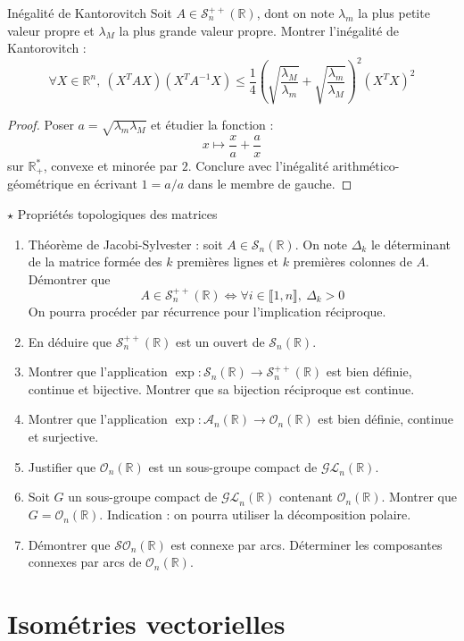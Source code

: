 \documentclass[french,a4paper]{article}
\newcommand{\R}{\mathbb{R}}
\newcommand{\st}{^*}
\newcommand{\inv}{^{-1}}
\theoremstyle{plain}
\theoremstyle{definition}
\theoremstyle{remark}
\begin{document}
\begin{ex}[cas]{Inégalité de Kantorovitch}
	Soit $A\in\mathcal{S}_n^{++}(\R)$, dont on note $\lambda_m$ la plus petite valeur propre et $\lambda_M$ la plus grande valeur propre. Montrer l'inégalité de Kantorovitch : $$\forall X\in\R^n,\ (X^TAX)(X^TA\inv X)\leqslant\frac{1}{4}\left(\sqrt{\frac{\lambda_M}{\lambda_m}}+\sqrt{\frac{\lambda_m}{\lambda_M}}\right)^2(X^TX)^2$$
\end{ex}
\begin{proof}
	Poser $a=\sqrt{\lambda_m\lambda_M}$ et étudier la fonction : $$x\mapsto\frac{x}{a}+\frac{a}{x}$$ sur $\R_+\st$, convexe et minorée par $2$. Conclure avec l'inégalité arithmético-géométrique en écrivant $1=a/a$ dans le membre de gauche.
\end{proof}

\begin{ex}[Châteaux]{$\star$ Propriétés topologiques des matrices}
	\begin{enumerate}
		\item Théorème de Jacobi-Sylvester : soit $A\in\mathcal{S}_n(\R)$. On note $\Delta_k$ le déterminant de la matrice formée des $k$ premières lignes et $k$ premières colonnes de $A$. Démontrer que $$A\in\mathcal{S}_n^{++}(\R)\iff \forall i\in\llbracket1,n\rrbracket,\ \Delta_k>0$$ On pourra procéder par récurrence pour l'implication réciproque. 
		\item En déduire que $\mathcal{S}_n^{++}(\R)$ est un ouvert de $\mathcal{S}_n(\R)$.
		\item Montrer que l'application $\exp:\mathcal{S}_n(\R)\to\mathcal{S}_n^{++}(\R)$ est bien définie, continue et bijective. Montrer que sa bijection réciproque est continue.
		\item Montrer que l'application $\exp:\mathcal{A}_n(\R)\to\mathcal{O}_n(\R)$ est bien définie, continue et surjective.
		\item Justifier que $\mathcal{O}_n(\R)$ est un sous-groupe compact de $\mathcal{GL}_n(\R)$.
		\item Soit $G$ un sous-groupe compact de $\mathcal{GL}_n(\R)$ contenant $\mathcal{O}_n(\R)$. Montrer que $G=\mathcal{O}_n(\R)$. Indication : on pourra utiliser la décomposition polaire.
		\item Démontrer que $\mathcal{SO}_n(\R)$ est connexe par arcs. Déterminer les composantes connexes par arcs de $\mathcal{O}_n(\R)$.
	\end{enumerate}
\end{ex}

\section{Isométries vectorielles}
\end{document}
